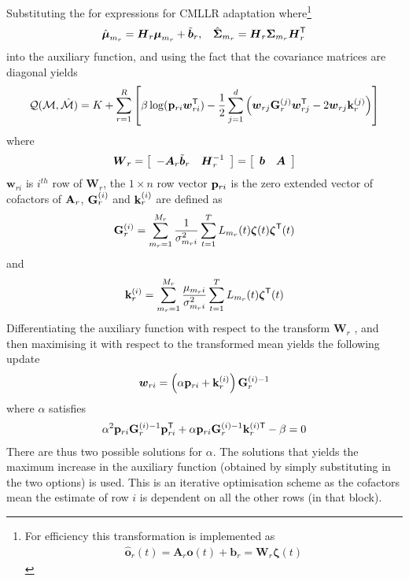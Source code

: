 Substituting the for expressions for CMLLR adaptation where\footnote{For
efficiency this transformation is implemented as
\begin{eqnarray}
\hat{\bm o}_r(t) = \bm{A}_r\bm{o}(t) + \bm{b}_r = \bm{W}_r\bm{\zeta}(t)
\end{eqnarray}
}
\begin{eqnarray}
\hat{{\mbox{\boldmath $\mu$}}}_{m_r} = {\mbox{\boldmath $H$}}_r{\mbox{\boldmath $\mu$}}_{m_r} + \tilde{{\mbox{\boldmath $b$}}}_r, \:\:\:\: 
\hat{{\mbox{\boldmath $\Sigma$}}}_{m_r} = {{\mbox{\boldmath $H$}}}_r{{\mbox{\boldmath $\Sigma$}}}_{m_r}{{\mbox{\boldmath $H$}}}_r^{\scriptstyle\sf T}
\end{eqnarray}
into the auxiliary function, and using the fact that the covariance
matrices are diagonal yields
\begin{eqnarray}
{\cal Q}({\cal M},{\hat{\cal M}}) = K + 
\sum_{r=1}^R\left[
\beta\log({\bf p}_{ri}{\mbox{\boldmath $w$}}_{ri}^{\scriptstyle\sf T})-
\frac{1}{2}
\sum_{j=1}^d{
\left({\mbox{\boldmath $w$}}_{rj}{\bf G}^{(j)}_r{\mbox{\boldmath $w$}}^{\scriptstyle\sf T}_{rj} - 2{\mbox{\boldmath $w$}}_{rj}{\bf k}^{(j)}_r
\right)}\right] \nonumber
\end{eqnarray}
where 
\begin{eqnarray}
{\mbox{\boldmath $W$}}_r = \left[\begin{array}{c c}
-{\mbox{\boldmath $A$}}_r\tilde{{\mbox{\boldmath $b$}}}_r & {\mbox{\boldmath $H$}}_r^{-1} \end{array}
\right] =  \left[\begin{array}{c c}
{\mbox{\boldmath $b$}} & {\mbox{\boldmath $A$}} \end{array}
\right]
\end{eqnarray}
$\bm{w}_{ri}$ is $i^{th}$ row of $\bm{W}_r$, the $1\times n$ row vector ${\bf p}_{ri}$ is the zero  
extended vector of cofactors of ${\bf A}_r$, ${\bf G}^{(i)}_r$ and ${\bf k}^{(i)}_r$ are defined as
\begin{eqnarray}
{\bf G}^{(i)}_r=\sum_{m_r=1}^{M_r}
\frac{1}{\sigma_{m_ri}^{2}}
\sum_{t=1}^TL_{m_r}(t){{\mbox{\boldmath $\zeta$}}}(t){{\mbox{\boldmath $\zeta$}}}^{{\scriptstyle\sf T}}(t)
\label{eq:gi_mllr3}
\end{eqnarray}
and 
\begin{eqnarray}
{\bf k}^{(i)}_r=\sum_{m_r=1}^{M_r}
\frac{\mu_{m_ri}}{\sigma_{m_ri}^{2}}
\sum_{t=1}^TL_{m_r}(t){{\mbox{\boldmath $\zeta$}}}^{{\scriptstyle\sf T}}(t)
\label{eq:gi_mllr4}
\end{eqnarray}
Differentiating the auxiliary function with respect to the transform
$\bm{W}_r$ , and then maximising it with respect to the transformed mean
yields the following update
\begin{eqnarray}
{\mbox{\boldmath $w$}}_{ri} = \left(\alpha{{\bf p}_{ri}} + {\bf k}^{(i)}_r\right){\bf G}^{(i)-1}_r
\end{eqnarray}
where $\alpha$ satisfies
\begin{eqnarray}
\alpha^2{\bf p}_{ri}{\bf G}^{(i)-1}_r{\bf p}_{ri}^{\scriptstyle\sf T}+
\alpha{\bf p}_{ri}{\bf G}^{(i)-1}_r{\bf k}^{(i){\scriptstyle\sf T}}_r - \beta=0\label{eq:alpha_quad}
\end{eqnarray}
There are thus two possible solutions for $\alpha$. The solutions that
yields the maximum increase in the auxiliary function (obtained by
simply substituting in the two options) is used. This is an iterative
optimisation scheme as the cofactors mean the estimate of row $i$ is
dependent on all the other rows (in that block).

